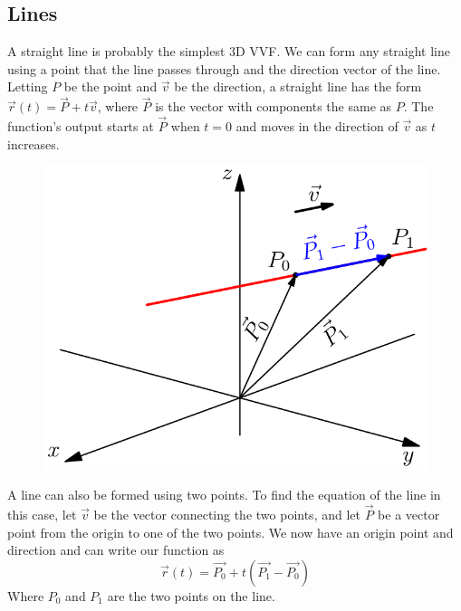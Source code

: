 \subsection{Lines}
\noindent
A straight line is probably the simplest 3D VVF. We can form any straight line using a point that the line passes through and the direction vector of the line.\\
Letting $P$ be the point and $\vec{v}$ be the direction, a straight line has the form $\vec{r}(t) = \vec{P}+t\vec{v}$, where $\vec{P}$ is the vector with components the same as $P$. The function's output starts at $\vec{P}$ when $t=0$ and moves in the direction of $\vec{v}$ as $t$ increases.

\begin{figure}[h]
	\centering
	\includegraphics[scale=0.33]{Images/vectorValuedFunctions/VectorLine}
\end{figure}

\noindent
A line can also be formed using two points. To find the equation of the line in this case, let $\vec{v}$ be the vector connecting the two points, and let $\vec{P}$ be a vector point from the origin to one of the two points. We now have an origin point and direction and can write our function as
\begin{equation*}
	\vec{r}(t) = \vec{P_0} + t\left(\vec{P_1} - \vec{P_0}\right)	
\end{equation*}
 Where $P_0$ and $P_1$ are the two points on the line.